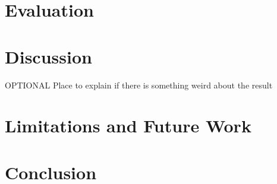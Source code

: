 \documentclass[letterpaper,twocolumn,10pt]{article}
\begin{document}
\section{Evaluation}

\section{Discussion}
OPTIONAL
Place to explain if there is something weird about the result

\section{Limitations and Future Work}

\section{Conclusion}



\end{document}
